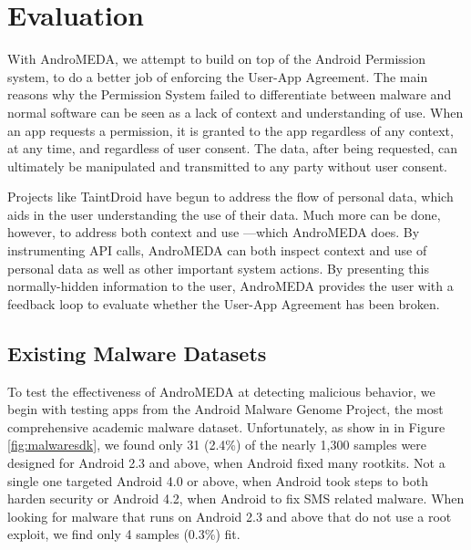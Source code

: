 \chapter{Evaluation}
\label{sec:framework}

With AndroMEDA, we attempt to build on top of the Android Permission system, to do a better job of enforcing the User-App Agreement. The main reasons why the Permission System failed to differentiate between malware and normal software can be seen as a lack of context and understanding of use. When an app requests a permission, it is granted to the app regardless of any context, at any time, and regardless of user consent. The data, after being requested, can ultimately be manipulated and transmitted to any party without user consent. 

Projects like TaintDroid\citep{enck2010taintdroid} have begun to address the flow of personal data, which aids in the user understanding the use of their data. Much more can be done, however, to address both context and use ---which AndroMEDA does. By instrumenting API calls, AndroMEDA can both inspect context and use of personal data as well as other important system actions. By presenting this normally-hidden information to the user, AndroMEDA provides the user with a feedback loop to evaluate whether the User-App Agreement has been broken.

\section{Existing Malware Datasets}



To test the effectiveness of AndroMEDA at detecting malicious behavior, we begin with testing apps from the Android Malware Genome Project\citep{zhou2012dissecting}, the most comprehensive academic malware dataset. Unfortunately, as show in in Figure \ref{fig:malwaresdk}, we found only 31 (2.4\%) of the nearly 1,300 samples were designed for Android 2.3 and above, when Android fixed many rootkits. Not a single one targeted Android 4.0 or above, when Android took steps to both harden security or Android 4.2, when Android to fix SMS related malware\citep{androidjbsecurity}. When looking for malware that runs on Android 2.3 and above that do not use a root exploit, we find only 4 samples (0.3\%) fit. 


